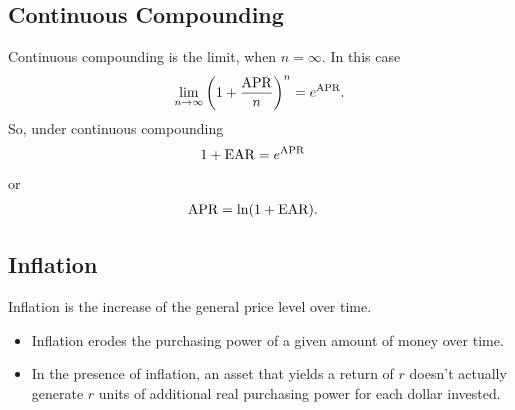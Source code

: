\documentclass[letterpaper,10pt,english]{sphinxmanual}
\begin{document}
\subsection{Continuous Compounding}
\label{returns:id2}
Continuous compounding is the limit, when $n = \infty$. In this
case
\begin{gather}
\begin{split}\lim_{n \to \infty} \left(1 + \frac{\text{APR}}{n}\right)^n =
e^{\text{APR}}.\end{split}\notag
\end{gather}
So, under continuous compounding
\begin{gather}
\begin{split}1 + \text{EAR} & = e^{\text{APR}}\end{split}\notag
\end{gather}
or
\begin{gather}
\begin{split}\text{APR} & = \ln(1+\text{EAR}).\end{split}\notag
\end{gather}

\subsection{Inflation}
\label{returns:inflation}
Inflation is the increase of the general price level over
time.
\begin{itemize}
\item {} 
Inflation erodes the purchasing power of a given amount of
money over time.

\end{itemize}
\begin{itemize}
\item {} 
In the presence of inflation, an asset that yields a return of
$r$ doesn't actually generate $r$ units of additional real
purchasing power for each dollar invested.

\end{itemize}
\end{document}
